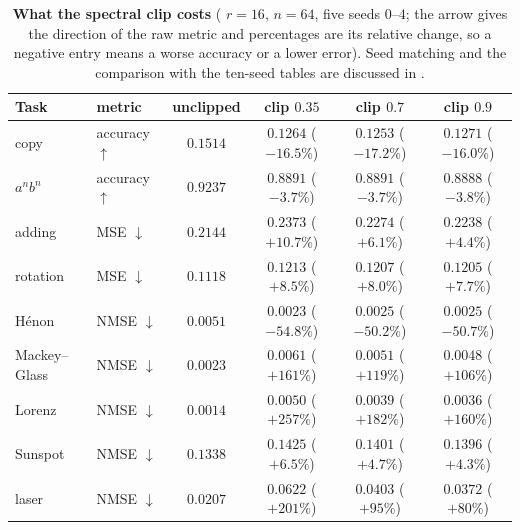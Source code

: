 
\begin{table}[t]
\centering\small
\caption{\textbf{What the spectral clip costs} (\skrtrl{} $r{=}16$, $n{=}64$, five seeds $0$--$4$; the arrow gives the direction of the raw metric and percentages are its relative change, so a negative entry means a worse accuracy or a lower error). Seed matching and the comparison with the ten-seed tables are discussed in .}
\label{tab:r2clipcost}
\begin{tabular}{llcccc}
\toprule
Task & metric & unclipped & clip $0.35$ & clip $0.7$ & clip $0.9$ \\
\midrule
copy & accuracy $\uparrow$ & $0.1514$ & $0.1264$ ($-16.5\%$) & $0.1253$ ($-17.2\%$) & $0.1271$ ($-16.0\%$) \\
$a^nb^n$ & accuracy $\uparrow$ & $0.9237$ & $0.8891$ ($-3.7\%$) & $0.8891$ ($-3.7\%$) & $0.8888$ ($-3.8\%$) \\
adding & MSE $\downarrow$ & $0.2144$ & $0.2373$ ($+10.7\%$) & $0.2274$ ($+6.1\%$) & $0.2238$ ($+4.4\%$) \\
rotation & MSE $\downarrow$ & $0.1118$ & $0.1213$ ($+8.5\%$) & $0.1207$ ($+8.0\%$) & $0.1205$ ($+7.7\%$) \\
\midrule
H\'enon & NMSE $\downarrow$ & $0.0051$ & $0.0023$ ($-54.8\%$) & $0.0025$ ($-50.2\%$) & $0.0025$ ($-50.7\%$) \\
Mackey--Glass & NMSE $\downarrow$ & $0.0023$ & $0.0061$ ($+161\%$) & $0.0051$ ($+119\%$) & $0.0048$ ($+106\%$) \\
Lorenz & NMSE $\downarrow$ & $0.0014$ & $0.0050$ ($+257\%$) & $0.0039$ ($+182\%$) & $0.0036$ ($+160\%$) \\
\midrule
Sunspot & NMSE $\downarrow$ & $0.1338$ & $0.1425$ ($+6.5\%$) & $0.1401$ ($+4.7\%$) & $0.1396$ ($+4.3\%$) \\
laser & NMSE $\downarrow$ & $0.0207$ & $0.0622$ ($+201\%$) & $0.0403$ ($+95\%$) & $0.0372$ ($+80\%$) \\
\bottomrule
\end{tabular}
\end{table}
